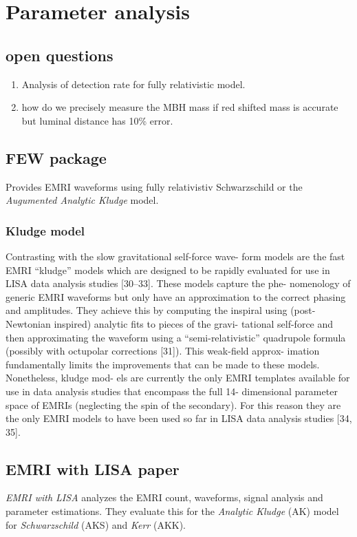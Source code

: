 \chapter{Parameter analysis}
\section{open questions}
\begin{enumerate}
        \item Analysis of detection rate for fully relativistic model.
        \item how do we precisely measure the MBH mass if red shifted mass is accurate but luminal distance has 10\% error.
\end{enumerate}


\section{FEW package}
Provides EMRI waveforms using fully relativistiv Schwarzschild or the \emph{Augumented Analytic Kludge} model.

\subsection{Kludge model}
Contrasting with the slow gravitational self-force wave-
form models are the fast EMRI “kludge” models which
are designed to be rapidly evaluated for use in LISA data
analysis studies [30–33]. These models capture the phe-
nomenology of generic EMRI waveforms but only have
an approximation to the correct phasing and amplitudes.
They achieve this by computing the inspiral using (post-
Newtonian inspired) analytic fits to pieces of the gravi-
tational self-force and then approximating the waveform
using a “semi-relativistic” quadrupole formula (possibly
with octupolar corrections [31]). This weak-field approx-
imation fundamentally limits the improvements that can
be made to these models. Nonetheless, kludge mod-
els are currently the only EMRI templates available for
use in data analysis studies that encompass the full 14-
dimensional parameter space of EMRIs (neglecting the
spin of the secondary). For this reason they are the only
EMRI models to have been used so far in LISA data
analysis studies [34, 35].


\section{EMRI with LISA paper}
\emph{EMRI with LISA} analyzes the EMRI count, waveforms, signal analysis and parameter estimations. They evaluate this for the \emph{Analytic Kludge} (AK) model for \emph{Schwarzschild} (AKS) and \emph{Kerr} (AKK).

